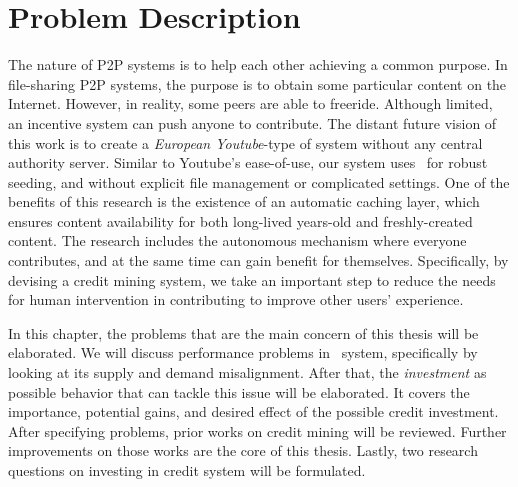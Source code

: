 \chapter{Problem Description}
\label{chp:relwork}
The nature of P2P systems is to help each other achieving a common purpose. In file-sharing P2P systems, the purpose is to obtain some particular content on the Internet. However, in reality, some peers are able to freeride. Although limited, an incentive system can push anyone to contribute. The distant future vision of this work is to create a \textit{European Youtube}-type of system without any central authority server. Similar to Youtube's ease-of-use, our system uses \bt~for robust seeding, and without explicit file management or complicated settings. One of the benefits of this research is the existence of an automatic caching layer, which ensures content availability for both long-lived years-old and freshly-created content. The research includes the autonomous mechanism where everyone contributes, and at the same time can gain benefit for themselves. Specifically, by devising a credit mining system, we take an important step to reduce the needs for human intervention in contributing to improve other users' experience.

In this chapter, the problems that are the main concern of this thesis will be elaborated. We will discuss performance problems in \bt~system, specifically by looking at its supply and demand misalignment. After that, the \textit{investment} as possible behavior that can tackle this issue will be elaborated. It covers the importance, potential gains, and desired effect of the possible credit investment. After specifying problems, prior works on credit mining will be reviewed. Further improvements on those works are the core of this thesis. Lastly, two research questions on investing in credit system will be formulated.
 

